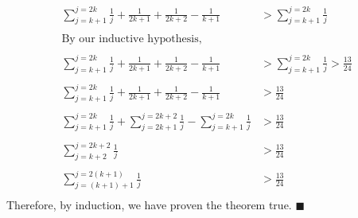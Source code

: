 \documentclass{article}
\begin{document}
\begin{enumerate}
\begin{align*}
	\displaystyle \sum_{j = k + 1}^{j = 2k} \frac{1}{j} +\frac{1}{2k+1}+\frac{1}{2k + 2} - \frac{1}{k+1} &>
	\displaystyle \sum_{j = k + 1}^{j = 2k} \frac{1}{j}\\\\
	\text{By our inductive hypothesis,}\\\\
	\displaystyle \sum_{j = k + 1}^{j = 2k} \frac{1}{j} +\frac{1}{2k+1}+\frac{1}{2k + 2} - \frac{1}{k+1} &>
	\displaystyle \sum_{j = k + 1}^{j = 2k} \frac{1}{j} > \frac{13}{24}\\\\
	\displaystyle \sum_{j = k + 1}^{j = 2k} \frac{1}{j} +\frac{1}{2k+1}+\frac{1}{2k + 2} - \frac{1}{k+1} &>
	\frac{13}{24}\\\\	
	\displaystyle \sum_{j = k + 1}^{j = 2k} \frac{1}{j} + \displaystyle \sum_{j = 2k + 1}^{j = 2k+2} \frac{1}{j}
	- \displaystyle \sum_{j = k + 1}^{j = 2k} \frac{1}{j} &> \frac{13}{24}\\\\
	\displaystyle \sum_ {j = k + 2}^{j = 2k+2} \frac{1}{j} &> \frac{13}{24}\\\\
	\displaystyle \sum_{j = (k + 1)+1}^{j = 2(k+1)} \frac{1}{j} &> \frac{13}{24}\\
	\end{align*}
	Therefore, by induction, we have proven the theorem true. \null\hfill $\blacksquare$\\\\
	

\end{enumerate}
\end{document}
